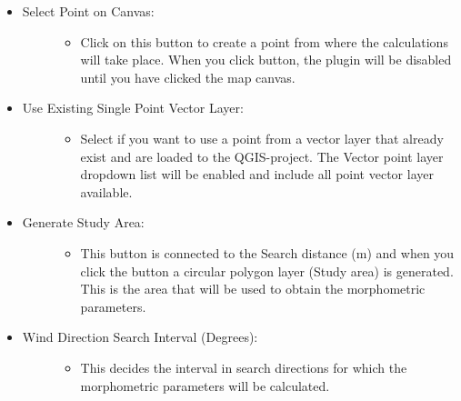 \documentclass[letterpaper,10pt,english]{sphinxmanual}
\begin{document}
\begin{itemize}
\item {} \begin{description}
\item[{Select Point on Canvas:}] \leavevmode\begin{itemize}
\item {} 
Click on this button to create a point from where the calculations will take place. When you click button, the plugin will be disabled until you have clicked the map canvas.

\end{itemize}

\end{description}

\item {} \begin{description}
\item[{Use Existing Single Point Vector Layer:}] \leavevmode\begin{itemize}
\item {} 
Select if you want to use a point from a vector layer that already exist and are loaded to the QGIS-project. The Vector point layer dropdown list will be enabled and include all point vector layer available.

\end{itemize}

\end{description}

\item {} \begin{description}
\item[{Generate Study Area:}] \leavevmode\begin{itemize}
\item {} 
This button is connected to the Search distance (m) and when you click the button a circular polygon layer (Study area) is generated. This is the area that will be used to obtain the morphometric parameters.

\end{itemize}

\end{description}

\item {} \begin{description}
\item[{Wind Direction Search Interval (Degrees):}] \leavevmode\begin{itemize}
\item {} 
This decides the interval in search directions for which the morphometric parameters will be calculated.


\end{itemize}
\end{description}
\end{itemize}
\end{document}
